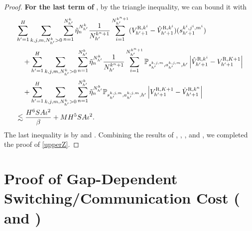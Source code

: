 \documentclass{article}
\newcommand{\R}{\textnormal{R}}
\begin{document}
\begin{proof}
\textbf{For the last term of }, by the triangle inequality, we can bound it with 
\begin{align}
\label{z5}
    &\sum_{{h'}=1}^H\sum_{k,j,m,N_{h'}^k >0}\sum_{n=1}^{N_{h'}^k} \Tilde{\eta}_n^{N_{h'}^k}\frac{1}{N_{h'}^{k^n+1}} \sum_{i=1}^{N_{h'}^{k^n+1}}(V_{{h'}+1}^{\R,k^i}-\hat{V}_{{h'}+1}^{\R,k^i})(s_{{h'}+1}^{k^i,j^i,m^i}) \nonumber\\
    &\quad + \sum_{{h'}=1}^H \sum_{k,j,m,N_{h'}^k >0}\sum_{n=1}^{N_{h'}^k} \Tilde{\eta}_n^{N_{h'}^k}\frac{1}{N_{h'}^{k^n+1}} \sum_{i=1}^{N_{h'}^{k^n+1}}\mathbb{P}_{s_{h'}^{k,j,m}, a_{h'}^{k,j,m},{h'}}\left|\hat{V}_{{h'}+1}^{\R,k^i}-V_{{h'}+1}^{\R,K+1}\right|  \nonumber\\
    &\quad +\sum_{{h'}=1}^H\sum_{k,j,m,N_{h'}^k >0}\sum_{n=1}^{N_{h'}^k} \Tilde{\eta}_n^{N_{h'}^k}\mathbb{P}_{s_{h'}^{k,j,m}, a_{h'}^{k,j,m},{h'}}\left|V_{{h'}+1}^{\R,K+1}-\hat{V}_{{h'}+1}^{\R,k^n}\right| \nonumber\\
    &\lesssim \frac{H^6SA\iota^2}{\beta}+ MH^5SA\iota^2.
\end{align}
The last inequality is by  and . Combining the results of , , ,  and , we completed the proof of \cref{upperZ}.
\end{proof}
\section{Proof of Gap-Dependent Switching/Communication Cost \texorpdfstring{( and )}{(Theorems 4.6 and Theorem 4.8)}}
\label{gapcost}
\end{document}
